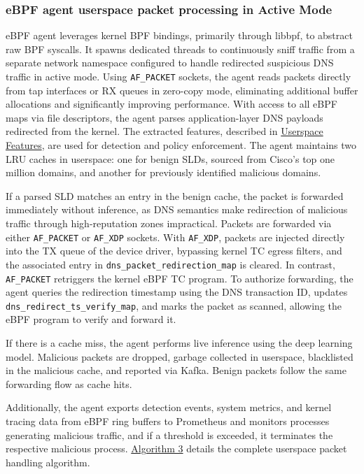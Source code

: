 \documentclass [11pt, proquest] {uwthesis}[2020/02/24]
\begin{document}
\subsubsection{\textbf{eBPF agent userspace packet processing in Active Mode}}
\label{active:sec2}
eBPF agent leverages kernel BPF bindings, primarily through libbpf, to abstract raw BPF syscalls. It spawns dedicated threads to continuously sniff traffic from a separate network namespace configured to handle redirected suspicious DNS traffic in active mode. Using \texttt{AF\_PACKET} sockets, the agent reads packets directly from tap interfaces or RX queues in zero-copy mode, eliminating additional buffer allocations and significantly improving performance. With access to all eBPF maps via file descriptors, the agent parses application-layer DNS payloads redirected from the kernel. The extracted features, described in \hyperref[sec:feature-userspace]{Userspace Features}, are used for detection and policy enforcement. The agent maintains two LRU caches in userspace: one for benign SLDs, sourced from Cisco’s top one million domains, and another for previously identified malicious domains. 

If a parsed SLD matches an entry in the benign cache, the packet is forwarded immediately without inference, as DNS semantics make redirection of malicious traffic through high-reputation zones impractical. Packets are forwarded via either \texttt{AF\_PACKET} or \texttt{AF\_XDP} sockets. With \texttt{AF\_XDP}, packets are injected directly into the TX queue of the device driver, bypassing kernel TC egress filters, and the associated entry in \texttt{dns\_packet\_redirection\_map} is cleared. In contrast, \texttt{AF\_PACKET} retriggers the kernel eBPF TC program. To authorize forwarding, the agent queries the redirection timestamp using the DNS transaction ID, updates \texttt{dns\_redirect\_ts\_verify\_map}, and marks the packet as scanned, allowing the eBPF program to verify and forward it.

If there is a cache miss, the agent performs live inference using the deep learning model. Malicious packets are dropped, garbage collected in userspace, blacklisted in the malicious cache, and reported via Kafka. Benign packets follow the same forwarding flow as cache hits.

Additionally, the agent exports detection events, system metrics, and kernel tracing data from eBPF ring buffers to Prometheus and monitors processes generating malicious traffic, and if a threshold is exceeded, it terminates the respective malicious process. \hyperref[sec:alg3]{Algorithm 3} details the complete userspace packet handling algorithm.
\end{document}
